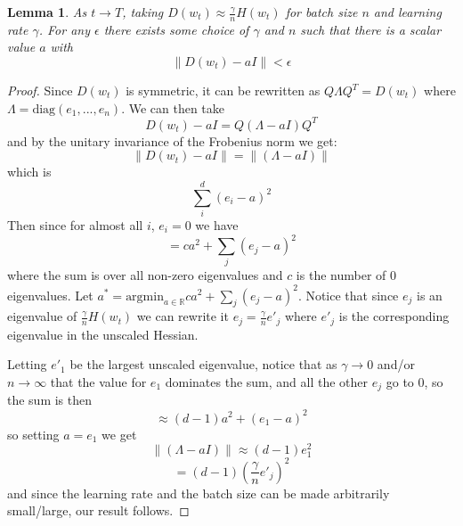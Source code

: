\documentclass{article} %
\newtheorem{lemma}{Lemma}[section]
\theoremstyle{definition}
\begin{document}
\begin{lemma}
    As $t \to T$, taking $D(w_t) \approx \frac{\gamma}{n}H(w_t)$ \citep{xie2021diffusiontheorydeeplearning} for batch size $n$ and learning rate $\gamma$. For any $\epsilon$ there exists some choice of $\gamma$ and $n$ such that there is a scalar value $a$ with
    \begin{equation}
        \| D(w_t) - aI\| < \epsilon
    \end{equation}
\end{lemma}
\begin{proof}
    Since $D(w_t)$ is symmetric, it can be rewritten as $Q \Lambda Q^T = D(w_t)$ where $\Lambda = \text{diag}(e_1, ..., e_n)$. We can then take
    \begin{equation}
        D(w_t) - aI = Q (\Lambda-aI) Q^T
    \end{equation}
    and by the unitary invariance of the Frobenius norm we get:
    \begin{equation}
        \|D(w_t) - aI\| = \|(\Lambda-aI)\|
    \end{equation}
    which is
    \begin{equation}
        \sum_i^d (e_i - a)^2
    \end{equation}
    Then since for almost all $i$, $e_i=0$ we have
    \begin{equation}
         = ca^2 + \sum_j (e_j - a)^2
    \end{equation}
    where the sum is over all non-zero eigenvalues and $c$ is the number of $0$ eigenvalues. Let $a^* = \text{argmin}_{a\in\mathbb{R}} ca^2 + \sum_j (e_j - a)^2$. Notice that since $e_j$ is an eigenvalue of $\frac{\gamma}{n}H(w_t)$ we can rewrite it $e_j = \frac{\gamma}{n}e'_j$ where $e'_j$ is the corresponding eigenvalue in the unscaled Hessian.

    Letting $e'_1$ be the largest unscaled eigenvalue, notice that as $\gamma \to 0$ and/or $n \to \infty$ that the value for $e_1$ dominates the sum, and all the other $e_j$ go to $0$, so the sum is then
    \begin{equation}
        \approx (d-1)a^2 + (e_1-a)^2
    \end{equation}
    so setting $a = e_1$ we get
    \begin{equation}
        \|(\Lambda-aI)\| \approx (d-1)e_1^2
    \end{equation}
        \begin{equation}
        = (d-1)(\frac{\gamma}{n}e'_j)^2
    \end{equation}
    and since the learning rate and the batch size can be made arbitrarily small/large, our result follows.
\end{proof}
\end{document}
